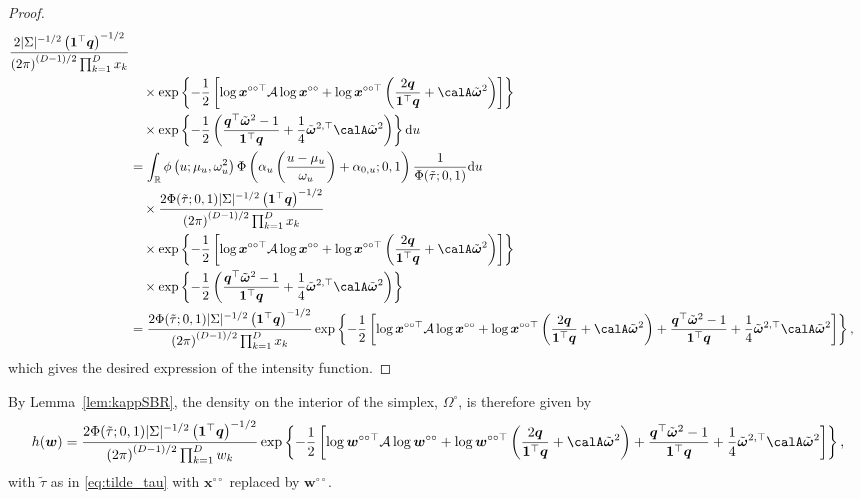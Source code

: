 \documentclass[12pt]{article}
\begin{document}
\begin{proof}
\begin{align*}
\frac{2| \Sigma |^{-1/2} \left( \bm 1^\top \bm q\right)^{-1/2}}{\left( 2\pi \right)^{(D-1)/2}\prod_{k=1}^Dx_k} \\
&\quad \times \exp \left\{ -\frac{1}{2} \left[ \log \bm x^{\circ\circ\top} \mathcal{A} \log \bm x^{\circ\circ} + \log \bm x^{\circ\circ\top} \left( \frac{2 \bm q}{\bm 1^\top \bm q} + \calA\tilde{\bm\omega}^2\right) \right]\right\} \\
& \quad \times \exp \left\{- \frac{1}{2} \left( \frac{\bm q^\top\tilde{\bm \omega}^2 - 1}{\bm 1 ^\top \bm q} + \frac{1}{4}\tilde{\bm\omega}^{2,\top}\calA\tilde{\bm\omega}^2\right) \right\} \text du   \\
&=  \int_{\mathbb R} \phi \left( u; \mu_u, \omega_u^2 \right) \Phi\left( \alpha_u\left(\frac{u-\mu_u}{\omega_u}\right) + \alpha_{0,u};0,1\right)\frac{1}{\Phi(\tilde{\tau};0,1)} \text du \\
&\quad\times \frac{2\Phi(\tilde{\tau};0,1)| \Sigma |^{-1/2} \left( \bm 1^\top \bm q\right)^{-1/2}}{\left( 2\pi \right)^{(D-1)/2}\prod_{k=1}^Dx_k} \\
&\quad \times \exp \left\{ -\frac{1}{2} \left[ \log \bm x^{\circ\circ\top} \mathcal{A} \log \bm x^{\circ\circ} + \log \bm x^{\circ\circ\top} \left( \frac{2 \bm q}{\bm 1^\top \bm q} + \calA\tilde{\bm\omega}^2\right) \right]\right\} \\
& \quad \times \exp \left\{- \frac{1}{2} \left( \frac{\bm q^\top\tilde{\bm \omega}^2 - 1}{\bm 1 ^\top \bm q} + \frac{1}{4}\tilde{\bm\omega}^{2,\top}\calA\tilde{\bm\omega}^2\right) \right\} \\
&=\frac{2\Phi(\tilde{\tau};0,1)| \Sigma |^{-1/2} \left( \bm 1^\top \bm q\right)^{-1/2}}{\left( 2\pi \right)^{(D-1)/2}\prod_{k=1}^Dx_k}\exp \left\{ -\frac{1}{2} \left[ \log \bm x^{\circ\circ\top} \mathcal{A} \log \bm x^{\circ\circ} + \log \bm x^{\circ\circ\top} \left( \frac{2 \bm q}{\bm 1^\top \bm q}+\calA\tilde{\bm\omega}^2\right) + \frac{\bm q^\top\tilde{\bm \omega}^2 - 1}{\bm 1 ^\top \bm q } + \frac{1}{4}\tilde{\bm\omega}^{2,\top}\calA\tilde{\bm\omega}^2 \right]\right\},
\end{align*}
which gives the desired expression of the intensity function. 
% 
\end{proof}

By Lemma~\ref{lem:kappSBR}, the density on the interior of the simplex, $\Omega^\circ$, is therefore given by
%
$$
h(\bm w) =\frac{2\Phi(\tilde{\tau};0,1)| \Sigma |^{-1/2} \left( \bm 1^\top \bm q\right)^{-1/2}}{\left( 2\pi \right)^{(D-1)/2}\prod_{k=1}^D w_k}\exp \left\{ -\frac{1}{2} \left[ \log \bm w^{\circ\circ\top} \mathcal{A} \log \bm w^{\circ\circ} + \log \bm w^{\circ\circ\top} \left( \frac{2 \bm q}{\bm 1^\top \bm q} + \calA\tilde{\bm\omega}^2\right) + \frac{\bm q^\top\tilde{\bm \omega}^2 - 1}{\bm 1 ^\top \bm q} + \frac{1}{4}\tilde{\bm\omega}^{2,\top}\calA\tilde{\bm\omega}^2 \right]\right\},
$$
with $\tilde{\tau}$ as in \eqref{eq:tilde_tau} with $\bm x^{\circ\circ}$ replaced by $\bm w^{\circ\circ}$.
\end{document}
